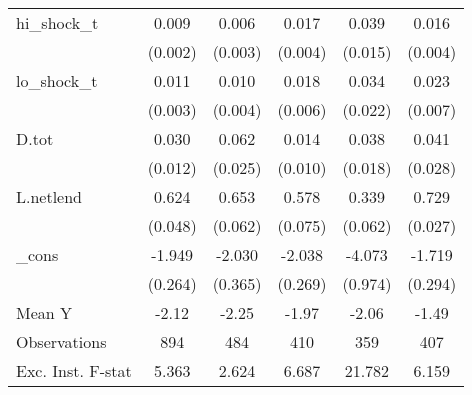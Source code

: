{\begin{tabular}{l*{5}{c}}
\addlinespace
hi\_shock\_t  &       0.009\sym{***}&       0.006\sym{**} &       0.017\sym{***}&       0.039\sym{**} &       0.016\sym{***}\\
            &     (0.002)         &     (0.003)         &     (0.004)         &     (0.015)         &     (0.004)         \\
\addlinespace
lo\_shock\_t  &       0.011\sym{***}&       0.010\sym{**} &       0.018\sym{***}&       0.034         &       0.023\sym{***}\\
            &     (0.003)         &     (0.004)         &     (0.006)         &     (0.022)         &     (0.007)         \\
\addlinespace
D.tot       &       0.030\sym{**} &       0.062\sym{**} &       0.014         &       0.038\sym{**} &       0.041         \\
            &     (0.012)         &     (0.025)         &     (0.010)         &     (0.018)         &     (0.028)         \\
\addlinespace
L.netlend   &       0.624\sym{***}&       0.653\sym{***}&       0.578\sym{***}&       0.339\sym{***}&       0.729\sym{***}\\
            &     (0.048)         &     (0.062)         &     (0.075)         &     (0.062)         &     (0.027)         \\
\addlinespace
\_cons      &      -1.949\sym{***}&      -2.030\sym{***}&      -2.038\sym{***}&      -4.073\sym{***}&      -1.719\sym{***}\\
            &     (0.264)         &     (0.365)         &     (0.269)         &     (0.974)         &     (0.294)         \\
\midrule
Mean Y      &       -2.12         &       -2.25         &       -1.97         &       -2.06         &       -1.49         \\
Observations&         894         &         484         &         410         &         359         &         407         \\
Exc. Inst. F-stat&       5.363         &       2.624         &       6.687         &      21.782         &       6.159         \\
\bottomrule
\end{tabular}
}
